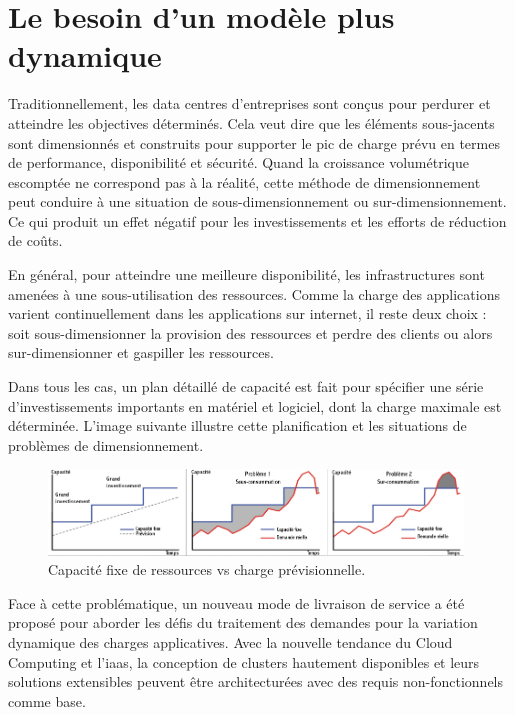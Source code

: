 \section{Le besoin d'un modèle plus dynamique}


Traditionnellement, les data centres d'entreprises sont conçus pour perdurer et atteindre les objectives déterminés. Cela veut dire que les éléments sous-jacents sont dimensionnés et construits pour supporter le pic de charge prévu en termes de performance, disponibilité et sécurité. Quand la croissance volumétrique escomptée ne correspond pas à la réalité, cette méthode de dimensionnement peut conduire à une situation de sous-dimensionnement ou sur-dimensionnement. Ce qui produit un effet négatif pour les investissements et les efforts de réduction de coûts.

En général, pour atteindre une meilleure disponibilité, les infrastructures sont amenées à une sous-utilisation des ressources. Comme la charge des applications varient continuellement dans les applications sur internet, il reste deux choix : soit sous-dimensionner la provision des ressources et perdre des clients ou alors sur-dimensionner et gaspiller les ressources. 

Dans tous les cas, un plan détaillé de capacité est fait pour spécifier une série d'investissements importants en matériel et logiciel, dont la charge maximale est déterminée. L'image suivante illustre cette planification et les situations de problèmes de dimensionnement.\\


\begin{figure}[h]
\begin{center}
\includegraphics[width=0.98\textwidth]{images/fixed_capacity_load_prediction_T} 
\caption{Capacité fixe de ressources vs charge prévisionnelle. \cite{awsScaling}}
\end{center}
\end{figure}

Face à cette problématique, un nouveau mode de livraison de service a été proposé pour aborder les défis du traitement des demandes pour la variation dynamique des charges applicatives. Avec la nouvelle tendance du Cloud Computing et l'\gls{iaas}, la conception de \glspl{cluster} hautement disponibles et leurs solutions extensibles peuvent être architecturées avec des requis non-fonctionnels comme base. 

